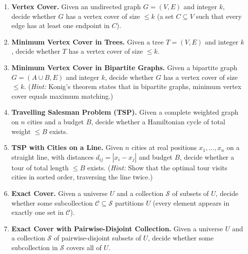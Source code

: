 \documentclass[9pt]{book}
\begin{document}
\begin{enumerate}[label=\arabic*.]

\item \textbf{Vertex Cover.}
Given an undirected graph $G=(V,E)$ and integer $k$, decide whether $G$ has a 
vertex cover of size $\leq k$ (a set $C\subseteq V$ such that every edge has at 
least one endpoint in $C$).

\bigskip

\item \textbf{Minimum Vertex Cover in Trees.}
Given a tree $T=(V,E)$ and integer $k$, decide whether $T$ has a vertex cover 
of size $\leq k$.

\bigskip

\item \textbf{Minimum Vertex Cover in Bipartite Graphs.}
Given a bipartite graph $G=(A\cup B,E)$ and integer $k$, decide whether $G$ has a
 vertex cover of size $\leq k$.
(\textit{Hint:} Konig's theorem states that in bipartite graphs, minimum vertex 
cover equals maximum matching.)

\bigskip

\item \textbf{Travelling Salesman Problem (TSP).}
Given a complete weighted graph on $n$ cities and a budget $B$, decide whether 
a Hamiltonian cycle of total weight $\leq B$ exists.

\bigskip

\item \textbf{TSP with Cities on a Line.}
Given $n$ cities at real positions $x_1,\ldots,x_n$ on a straight line, with distances $d_{ij}=|x_i-x_j|$ and budget $B$, decide whether a tour of total length $\leq B$ exists.
(\textit{Hint:} Show that the optimal tour visits cities in sorted order, traversing the line twice.)

\bigskip

\item \textbf{Exact Cover.}
Given a universe $U$ and a collection $\mathcal{S}$ of subsets of $U$, decide whether some subcollection $\mathcal{C}\subseteq\mathcal{S}$ partitions $U$ (every element appears in exactly one set in $\mathcal{C}$).

\bigskip

\item \textbf{Exact Cover with Pairwise-Disjoint Collection.}
Given a universe $U$ and a collection $\mathcal{S}$ of pairwise-disjoint
 subsets of $U$, decide whether some subcollection in $\mathcal{S}$ covers all of $U$.


\end{enumerate}
\end{document}

